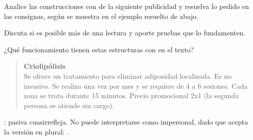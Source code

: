 \begin{ejercicio}\label{ej:10-criolipolisis}
Analice las construcciones con  de la siguiente publicidad y resuelva
lo pedido en las consignas, según se muestra en el ejemplo resuelto de abajo.

\begin{consignas}
  \item Discuta si es posible más de una lectura y aporte pruebas que lo
        fundamenten.
  \item ¿Qué funcionamiento tienen estas estructuras con  en el texto?
\end{consignas}

\begin{quote}\small
\textbf{Criolipólisis}\\
Se ofrece un tratamiento para eliminar adiposidad localizada. Es no invasivo. Se
realiza una vez por mes y se requiere de 4 a 6 sesiones. Cada zona se trata
durante 15 minutos. Precio promocional 2x1 (la segunda persona se atiende sin
cargo).
\end{quote}

\begin{resuelto}
: pasiva cuasirrefleja. No puede interpretarse como impersonal,
dado que acepta la versión en plural: .
\end{resuelto}
\end{ejercicio}

